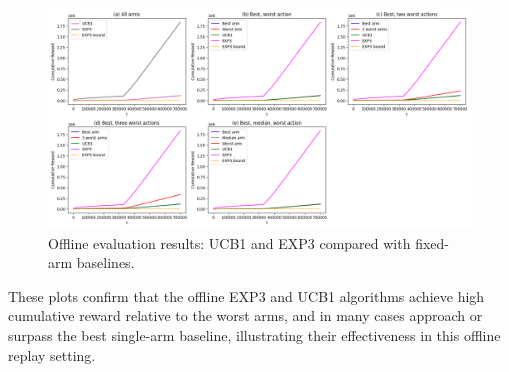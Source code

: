 \begin{figure}[H]
  \centering
  \includegraphics[width=1\textwidth]{Code/bandits_plots.png} %
  \caption{Offline evaluation results: UCB1 and EXP3 compared with fixed-arm baselines.}
  \label{fig:offline-bandits}
\end{figure}


These plots confirm that the offline EXP3 and UCB1 algorithms achieve high cumulative reward relative to the worst arms, and in many cases approach or surpass the best single-arm baseline, illustrating their effectiveness in this offline replay setting.
